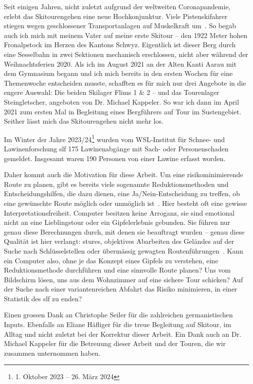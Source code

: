 


Seit einigen Jahren, nicht zuletzt aufgrund der weltweiten Coronapandemie, erlebt das Skitourengehen eine neue Hochkonjunktur. Viele Pistenskifahrer stiegen wegen geschlossener Transportanlagen auf Muskelkraft um~\cite{sacCoronaTrend}. So begab auch ich mich mit meinem Vater auf meine erste Skitour – den 1922 Meter hohen Fronalpstock im Herzen des Kantons Schwyz. Eigentlich ist dieser Berg durch eine Sesselbahn in zwei Sektionen mechanisch erschlossen, nicht aber während der Weihnachtsferien 2020.
Als ich im August 2021 an der Alten Kanti Aarau mit dem Gymnasium begann und ich mich bereits in den ersten Wochen für eine Themenwoche entscheiden musste, schafften es für mich nur drei Angebote in die engere Auswahl: Die beiden Skilager Flims 1 \& 2 – und das Tourenlager Steingletscher, angeboten von Dr. Michael Kappeler. So war ich dann im April 2021 zum ersten Mal in Begleitung eines Bergführers auf Tour im Sustengebiet. Seither lässt mich das Skitourengehen nicht mehr los.

Im Winter der Jahre 2023/24\footnote{1. Oktober 2023 -- 26. März 2024} wurden vom WSL-Institut für Schnee- und Lawinenforschung \gls{slf} 175 Lawinenabgänge mit Sach- oder Personenschaden gemeldet. Insgesamt waren 190 Personen von einer Lawine erfasst worden.~\cite{slfWinterbericht202324}

Daher kommt auch die Motivation für diese Arbeit. Um eine risikominimierende Route zu planen, gibt es bereits viele sogenannte Reduktionsmethoden und Entscheidungshilfen, die dazu dienen, eine Ja/Nein-Entscheidung zu treffen, ob eine gewünschte Route möglich oder unmöglich ist~\cite{skitourenguruReduktionsmethoden}\cite{harveyrhynerschweizerlawinenkunde}.
Hier besteht oft eine gewisse Interpretationsfreiheit. Computer besitzen keine Arroganz, sie sind emotional nicht an eine Lieblingstour oder ein Gipfelerlebnis gebunden. Sie führen nur genau diese Berechnungen durch, mit denen sie beauftragt wurden – genau diese Qualität ist hier verlangt: stures, objektives Abarbeiten des Geländes auf der Suche nach Schlüsselstellen oder übermässig gewagten Routenführungen~\cite{harveyrhynerschweizerlawinenkunde}. Kann ein Computer also, ohne je das Konzept eines Gipfels zu verstehen, eine Reduktionsmethode durchführen und eine sinnvolle Route planen? Uns vom Bildschirm lösen, uns aus dem Wohnzimmer auf eine sichere Tour schicken? 
Auf der Suche nach einer variantenreichen Abfahrt das Risiko minimieren, in einer Statistik des \gls{slf} zu enden?

Einen grossen Dank an Christophe Seiler für die zahlreichen germanistischen Inputs. Ebenfalls an Eliane Häfliger für die treue Begleitung auf Skitour, im Alltag und nicht zuletzt bei der Korrektur dieser Arbeit. Ein Dank auch an Dr. Michael Kappeler für die Betreuung dieser Arbeit und der Touren, die wir zusammen unternommen haben.
